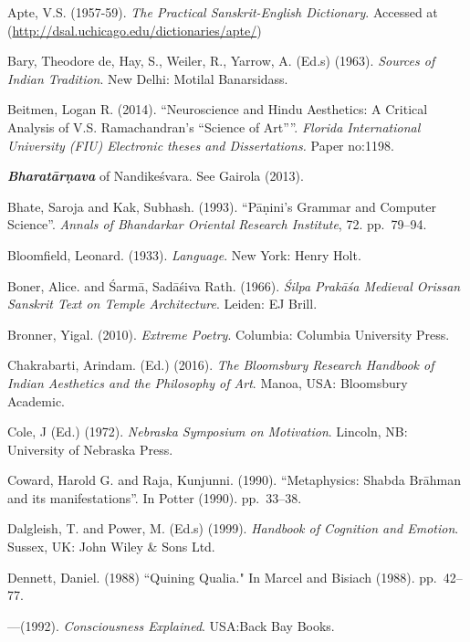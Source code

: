 \begin{thebibliography}{99}
\itemsep=2pt
Apte, V.S. (1957-59). \textsl{The Practical Sanskrit-English Dictionary}.  Accessed at (\url{http://dsal.uchicago.edu/dictionaries/apte/})

Bary, Theodore de, Hay, S., Weiler, R., Yarrow, A. (Ed.s) (1963). \textsl{Sources of Indian Tradition}. New Delhi: Motilal Banarsidass.

Beitmen, Logan R. (2014). ``Neuroscience and Hindu Aesthetics: A Critical Analysis of V.S. Ramachandran's ``Science of Art''''. \textsl{Florida International University (FIU) Electronic theses and Dissertations.} Paper no:1198.

{\sl\bfseries Bharatārṇava} of Nandikeśvara. See Gairola (2013).

Bhate, Saroja and Kak, Subhash. (1993). “Pāṇini’s Grammar and Computer Science”. \textsl{Annals of Bhandarkar Oriental Research Institute}, 72. pp.~79--94.

Bloomfield, Leonard. (1933). \textsl{Language}. New York: Henry Holt.

Boner, Alice. and Śarmā, Sadāśiva Rath. (1966). \textsl{Śilpa Prakāśa Medieval Orissan Sanskrit Text on Temple Architecture}. Leiden: EJ Brill.

Bronner, Yigal. (2010). \textsl{Extreme Poetry}. Columbia: Columbia University Press.

Chakrabarti, Arindam. (Ed.) (2016). \textsl{The Bloomsbury Research Handbook of Indian Aesthetics and the Philosophy of Art}. Manoa, USA: Bloomsbury Academic.

Cole, J (Ed.) (1972). \textsl{Nebraska Symposium on Motivation}. Lincoln, NB: University of Nebraska Press.

Coward, Harold G. and Raja, Kunjunni. (1990). “Metaphysics: Shabda Brāhman and its manifestations”. In Potter (1990). pp.~33--38.

Dalgleish, T. and Power, M. (Ed.s) (1999). \textsl{Handbook of Cognition and Emotion}. Sussex, UK: John Wiley \& Sons Ltd.

Dennett, Daniel. (1988) ``Quining Qualia." In Marcel and Bisiach (1988). pp.~42--77.

---\kern3pt(1992). \textsl{Consciousness Explained}. USA:Back Bay Books.


\end{thebibliography}
